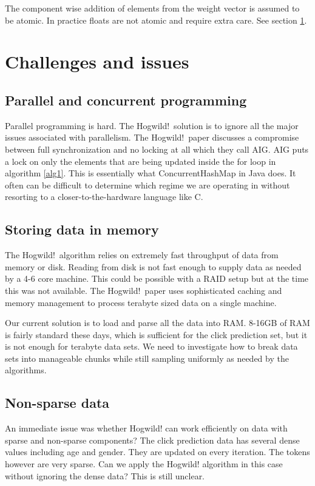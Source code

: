 \documentclass{article} %
\begin{document}
The component wise addition of elements from the weight vector is assumed to be atomic. In practice floats are not atomic and require extra care. See section \ref{gen_inst}.

\section{Challenges and issues}
\label{gen_inst}
\subsection{Parallel and concurrent programming}
Parallel programming is hard. The Hogwild!~solution is to ignore all the major issues associated with parallelism. The Hogwild!~paper discusses a compromise between full synchronization and no locking at all which they call AIG. AIG puts a lock on only the elements that are being updated inside the for loop in algorithm \ref{alg1}. This is essentially what ConcurrentHashMap in Java does. It often can be difficult to determine which regime we are operating in without resorting to a closer-to-the-hardware language like C.

\subsection{Storing data in memory}
The Hogwild!~algorithm relies on extremely fast throughput of data from memory or disk. Reading from disk is not fast enough to supply data as needed by a 4-6 core machine. This could be possible with a RAID setup but at the time this was not available. The Hogwild!~paper uses sophisticated caching and memory management to process terabyte sized data on a single machine.

Our current solution is to load and parse all the data into RAM. 8-16GB of RAM is fairly standard these days, which is sufficient for the click prediction set, but it is not enough for terabyte data sets. We need to investigate how to break data sets into manageable chunks while still sampling uniformly as needed by the algorithms. 

\subsection{Non-sparse data}
An immediate issue was whether Hogwild! can work efficiently on data with sparse and non-sparse components? The click prediction data has several dense values including age and gender. They are updated on every iteration. The tokens however are very sparse. Can we apply the Hogwild! algorithm in this case without ignoring the dense data? This is still unclear.
\end{document}
